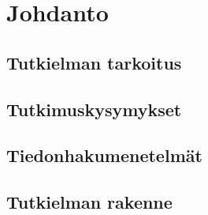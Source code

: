 \chapter{Johdanto} \label{Johdanto}
\section{Tutkielman tarkoitus}\label{tTarkoitus}
\section{Tutkimuskysymykset}\label{tutkimuskysymykset}
\section{Tiedonhakumenetelmät}\label{tiedonhakuM}
\section{Tutkielman rakenne}\label{tRakenne}
